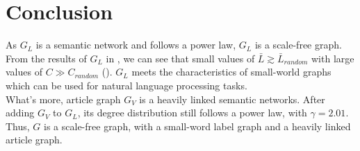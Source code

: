 \section{Conclusion}
As $G_L$ is a semantic network and follows a power law, $G_L$ is a scale-free graph. From the results of $G_L$ in , we can see that small values of $\bar{L} \gtrsim \bar{L}_{random}$ with large values of $C \gg C_{random}$ (\cite{zesch2007analysis}). $G_L$ meets the characteristics of small-world graphs which can be used for natural language processing tasks. \\
What's more, article graph $G_V$ is a heavily linked semantic networks. After adding $G_V$ to $G_L$, its degree distribution still follows a power law, with $\gamma = 2.01$. Thus, $G$ is a scale-free graph, with a small-word label graph and a heavily linked article graph.
